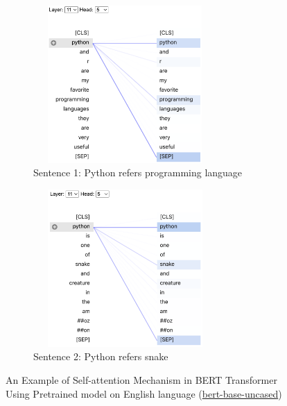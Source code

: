 \begin{figure}[ht]
    \centering
    \begin{subfigure}[t]{0.45\textwidth}
    \includegraphics[width=7cm, height=6cm]{03-Chapter-Three/image/vis2.png}
    \caption{Sentence 1: Python refers programming language}
    \label{fig:python1}
    \end{subfigure}
    \centering
    \begin{subfigure}[t]{0.45\textwidth}
    \includegraphics[width=7cm, height=6cm]{03-Chapter-Three/image/vis3.png}
    \caption{Sentence 2: Python refers snake}
    \label{fig:python2}    
    \end{subfigure}
    \caption{An Example of Self-attention Mechanism in BERT  Transformer Using 
    Pretrained model on English language (\href{https://huggingface.co/bert-base-uncased}{bert-base-uncased})
    }
    \label{fig:visbert}    
\end{figure}